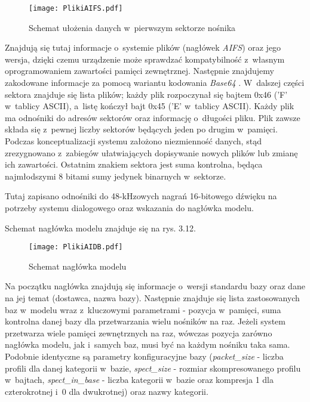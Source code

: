 \begin{figure}[h]
	\centering
	\texttt{[image: PlikiAIFS.pdf]}
	\caption{Schemat ułożenia danych w~pierwszym sektorze nośnika}
\end{figure}
\FloatBarrier %

Znajdują się tutaj informacje o~systemie plików (nagłówek \textit{AIFS}) oraz jego wersja, dzięki czemu urządzenie może sprawdzać kompatybilność z~własnym oprogramowaniem zawartości pamięci zewnętrznej. Następnie znajdujemy zakodowane informacje za pomocą wariantu kodowania \textit{Base64} \cite{Base64}. W~dalszej części sektora znajduje się lista plików; każdy plik rozpoczynał się bajtem 0x46 ('F' w~tablicy ASCII), a~listę kończył bajt 0x45 ('E' w~tablicy ASCII). Każdy plik ma odnośniki do adresów sektorów oraz informację o~długości pliku. Plik zawsze składa się z~pewnej liczby sektorów będących jeden po drugim w~pamięci. Podczas konceptualizacji systemu założono niezmienność danych, stąd zrezygnowano z~zabiegów ułatwiających dopisywanie nowych plików lub zmianę ich zawartości. Ostatnim znakiem sektora jest suma kontrolna, będąca najmłodszymi 8 bitami sumy jedynek binarnych w~sektorze.

Tutaj zapisano odnośniki do 48-kHzowych nagrań 16-bitowego dźwięku na potrzeby systemu dialogowego oraz wskazania do nagłówka modelu.

Schemat nagłówka modelu znajduje się na rys. 3.12.

\begin{figure}[h]
	\centering
	\texttt{[image: PlikiAIDB.pdf]}
	\caption{Schemat nagłówka modelu}
\end{figure}
\FloatBarrier %

Na początku nagłówka znajdują się informacje o~wersji standardu bazy oraz dane na jej temat (dostawca, nazwa bazy). Następnie znajduje się lista zastosowanych baz w~modelu wraz z~kluczowymi parametrami - pozycja w~pamięci, suma kontrolna danej bazy dla przetwarzania wielu nośników na raz. Jeżeli system przetwarza wiele pamięci zewnętrznych na raz, wówczas pozycja zarówno nagłówka modelu, jak i~samych baz, musi być na każdym nośniku taka sama. Podobnie identyczne są parametry konfiguracyjne bazy (\textit{packet\_size} - liczba profili dla danej kategorii w~bazie, \textit{spect\_size} - rozmiar skompresowanego profilu w~bajtach, \textit{spect\_in\_base} - liczba kategorii w~bazie oraz kompresja 1 dla czterokrotnej i~0 dla dwukrotnej) oraz nazwy kategorii.

